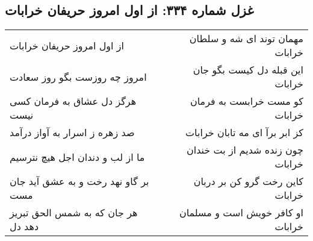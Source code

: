 \begin{center}
\section*{غزل شماره ۳۳۴: از اول امروز حریفان خرابات}
\label{sec:0334}
\begin{longtable}{l p{0.5cm} r}
از اول امروز حریفان خرابات
&&
مهمان توند ای شه و سلطان خرابات
\\
امروز چه روزست بگو روز سعادت
&&
این قبله دل کیست بگو جان خرابات
\\
هرگز دل عشاق به فرمان کسی نیست
&&
کو مست خرابست به فرمان خرابات
\\
صد زهره ز اسرار به آواز درآمد
&&
کز ابر برآ ای مه تابان خرابات
\\
ما از لب و دندان اجل هیچ نترسیم
&&
چون زنده شدیم از بت خندان خرابات
\\
بر گاو نهد رخت و به عشق آید جان مست
&&
کاین رخت گرو کن بر دربان خرابات
\\
هر جان که به شمس الحق تبریز دهد دل
&&
او کافر خویش است و مسلمان خرابات
\\
\end{longtable}
\end{center}
